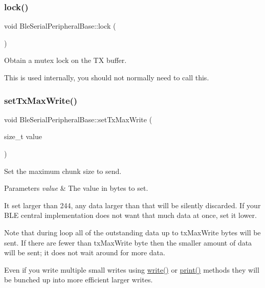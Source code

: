 \subsubsection{\texorpdfstring{lock()}{lock()}}
{\footnotesize\ttfamily void Ble\+Serial\+Peripheral\+Base\+::lock (\begin{DoxyParamCaption}{ }\end{DoxyParamCaption})}



Obtain a mutex lock on the TX buffer. 

This is used internally, you should not normally need to call this. \mbox{\label{class_ble_serial_peripheral_base_a454bb53617c96d564f3e20d13765de9f}} 
\subsubsection{\texorpdfstring{set\+Tx\+Max\+Write()}{setTxMaxWrite()}}
{\footnotesize\ttfamily void Ble\+Serial\+Peripheral\+Base\+::set\+Tx\+Max\+Write (\begin{DoxyParamCaption}\item[{size\+\_\+t}]{value }\end{DoxyParamCaption})\hspace{0.3cm}{\ttfamily [inline]}}



Set the maximum chunk size to send. 


\begin{DoxyParams}{Parameters}
{\em value} & The value in bytes to set.\\
\hline
\end{DoxyParams}
It set larger than 244, any data larger than that will be silently discarded. If your B\+LE central implementation does not want that much data at once, set it lower.

Note that during loop all of the outstanding data up to tx\+Max\+Write bytes will be sent. If there are fewer than tx\+Max\+Write byte then the smaller amount of data will be sent; it does not wait around for more data.

Even if you write multiple small writes using \mbox{\hyperlink{class_ble_serial_peripheral_base_ac041322685f26d921f60d01a2ed99e83}{write()}} or \mbox{\hyperlink{class_print_acfe80773011eb17dfb52c2fba517a093}{print()}} methods they will be bunched up into more efficient larger writes. \mbox{\label{class_ble_serial_peripheral_base_ab6c9183c6e2d42babe005b222b984d03}} 
